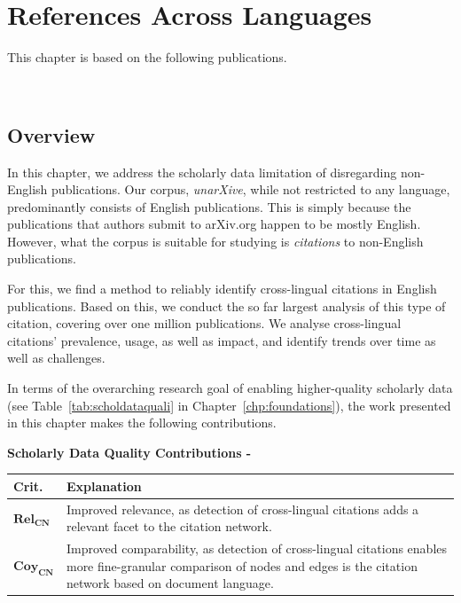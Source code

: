 \chapter{References Across Languages}
\label{chp:xling}

This chapter is based on the following publications.
\begin{infobox-pub}
\\
\end{infobox-pub}

\begin{infobox-pub}
\end{infobox-pub}

\section{Overview}
In this chapter, we address the scholarly data limitation of disregarding non-English publications. Our corpus, \emph{unarXive}, while not restricted to any language, predominantly consists of English publications. This is simply because the publications that authors submit to arXiv.org happen to be mostly English. However, what the corpus is suitable for studying is \emph{citations} to non-English publications.

For this, we find a method to reliably identify cross-lingual citations in English publications. Based on this, we conduct the so far largest analysis of this type of citation, covering over one million publications. We analyse cross-lingual citations' prevalence, usage, as well as impact, and identify trends over time as well as challenges.

In terms of the overarching research goal of enabling higher-quality scholarly data (see Table~\ref{tab:scholdataquali} in Chapter~\ref{chp:foundations}), the work presented in this chapter makes the following contributions.

\begin{infobox-progress}
      \textbf{Scholarly Data Quality Contributions - \cite{Saier2020xling,Saier2021}}\vspace{0.5em}

      \begin{tabular}{lp{10.9cm}}
        \toprule
        Crit. & Explanation \\
        \midrule
        $\mathbf{Rel_{CN}}$ & Improved relevance, as detection of cross-lingual citations adds a relevant facet to the citation network. \\
        $\mathbf{Coy_{CN}}$ & Improved comparability, as detection of cross-lingual citations enables more fine-granular comparison of nodes and edges is the citation network based on document language. \\
        \bottomrule
      \end{tabular}
\end{infobox-progress}

